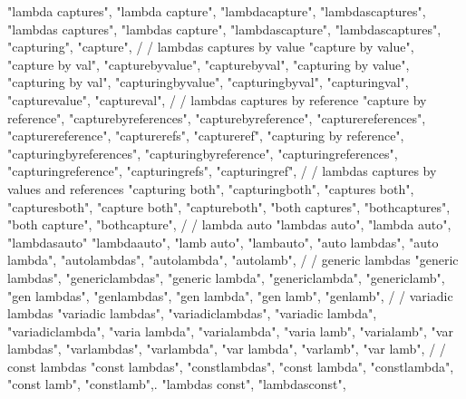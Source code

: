         "lambda captures",  
        "lambda capture",  
        "lambdacapture",  
        "lambdascaptures",  
        "lambdas captures",  
        "lambdas capture",  
        "lambdascapture",  
        "lambdascaptures",  
        "capturing",  
        "capture",  
        /
        / lambdas captures by value
        "capture by value",  
        "capture by val",  
        "capturebyvalue",  
        "capturebyval",  
        "capturing by value",  
        "capturing by val",  
        "capturingbyvalue",  
        "capturingbyval",  
        "capturingval",  
        "capturevalue",  
        "captureval",  
        /
        / lambdas captures by reference 
        "capture by reference",  
        "capturebyreferences",  
        "capturebyreference",  
        "capturereferences",  
        "capturereference",  
        "capturerefs",  
        "captureref",  
        "capturing by reference",  
        "capturingbyreferences",  
        "capturingbyreference",  
        "capturingreferences",  
        "capturingreference",  
        "capturingrefs",  
        "capturingref",  
        /
        / lambdas captures by values and references 
        "capturing both",  
        "capturingboth",  
        "captures both",  
        "capturesboth",  
        "capture both",  
        "captureboth",  
        "both captures",  
        "bothcaptures",  
        "both capture",  
        "bothcapture",  
        /
        / lambda auto
        "lambdas auto",
        "lambda auto",
        "lambdasauto"
        "lambdaauto",
        "lamb auto",
        "lambauto",
        "auto lambdas",
        "auto lambda",
        "autolambdas",
        "autolambda",
        "autolamb",
        /
        / generic lambdas
        "generic lambdas",  
        "genericlambdas",  
        "generic lambda",  
        "genericlambda",  
        "genericlamb",  
        "gen lambdas",  
        "genlambdas",  
        "gen lambda",  
        "gen lamb",  
        "genlamb",  
        /
        / variadic lambdas 
        "variadic lambdas",  
        "variadiclambdas",  
        "variadic lambda",  
        "variadiclambda",  
        "varia lambda",  
        "varialambda",  
        "varia lamb",  
        "varialamb",  
        "var lambdas",  
        "varlambdas",  
        "varlambda",  
        "var lambda",  
        "varlamb",  
        "var lamb",  
        /
        / const lambdas 
        "const lambdas",
        "constlambdas",
        "const lambda",
        "constlambda",
        "const lamb",
        "constlamb",.
        "lambdas const",
        "lambdasconst",
